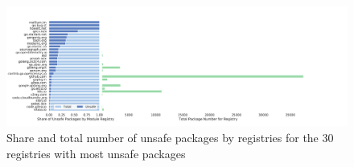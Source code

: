 \begin{figure}[htp!]
    \centering
    \includegraphics[width=\textwidth]{assets/plots/chapter4/unsafe-packages-by-registry-n30.pdf}
    \caption{Share and total number of unsafe packages by registries for the 30 registries with most unsafe packages}
    \label{fig:unsafe-packages-by-registry-n30}
\end{figure}
